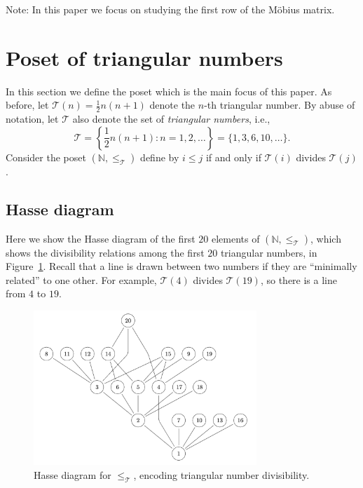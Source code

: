 \documentclass{amsart}
\theoremstyle{definition}
\newcommand{\NN}{\mathbb{N}}
\newcommand{\Mobius}{M\"obius}
\newcommand{\leqtri}{\leq_{\tri}}
\newcommand{\tri}{\mathcal T}
\begin{document}
Note: In this paper we focus on studying the first row of the \Mobius{} matrix. 

\section{Poset of triangular numbers}

In this section we define the poset which is the main focus of this paper.
As before, let $\tri(n) = \frac12 n(n + 1)$ denote the $n$-th triangular number.
By abuse of notation, let $\tri$ also denote the set of {\em triangular numbers}, i.e.,
\[
    \tri = \left\{ \textstyle\frac12 n (n + 1) : n = 1, 2, \ldots \right\}
    = \{1, 3, 6, 10, \ldots \}.
\]
Consider the poset $(\NN, \leqtri)$ define by $i \leq j$ if and only if $\tri(i)$ divides $\tri(j)$.

\subsection{Hasse diagram}

Here we show the Hasse diagram of the first $20$ elements of $(\NN, \leqtri)$,
which shows the divisibility relations among the first $20$ triangular numbers,
in Figure~\ref{fig:hasse-triangle}.
Recall that a line is drawn between two numbers if they are ``minimally related'' to one other. 
For example, $\tri(4)$ divides $\tri(19)$, so there is a line from $4$ to $19$. 

\begin{figure}[h!]
\centering
\includegraphics[width= 0.75\textwidth]{Hasse_Diagram_for_Triangular_Numbers.png}
\caption{Hasse diagram for $\leqtri$, encoding triangular number divisibility.}
\label{fig:hasse-triangle}
\end{figure}
\end{document}
